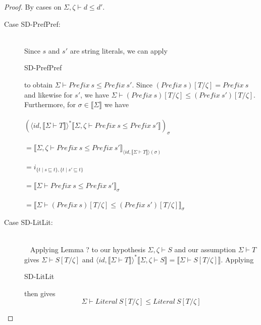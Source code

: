 \documentclass{article}
\newcommand{\sem}[1]{\llbracket #1 \rrbracket}
\begin{document}
\begin{proof}
By cases on $\Sigma,\zeta \vdash d \leq d'$.
\begin{description}
\item[Case SD-PrefPref:]~\\
Since $s$ and $s'$ are string literals, we can apply \begin{sc}SD-PrefPref\end{sc} to obtain $\Sigma \vdash \mathit{Prefix}~s \leq \mathit{Prefix}~s'$. Since $(\mathit{Prefix}~s)[T/\zeta] = \mathit{Prefix}~s$ and likewise for $s'$, we have $\Sigma \vdash (\mathit{Prefix}~s)[T/\zeta] \leq (\mathit{Prefix}~s')[T/\zeta]$. Furthermore, for $\sigma \in \sem{\Sigma}$ we have\\~\\ 
$(\langle \mathit{id}, \sem{\Sigma \vdash T} \rangle^* \sem{\Sigma,\zeta \vdash \mathit{Prefix}~s \leq \mathit{Prefix}~s'})_\sigma$\\~\\
$= \sem{\Sigma,\zeta \vdash \mathit{Prefix}~s \leq \mathit{Prefix}~s'}_{\langle \mathit{id}, \sem{\Sigma \vdash T} \rangle(\sigma)}$\\~\\
$= i_{\{ t \mid s \sqsubseteq t \}, \{ t \mid s' \sqsubseteq t \}}$\\~\\
$= \sem{\Sigma \vdash \mathit{Prefix}~s \leq \mathit{Prefix}~s'}_{\sigma}$\\~\\
$= \sem{\Sigma \vdash (\mathit{Prefix}~s)[T/\zeta] \leq (\mathit{Prefix}~s')[T/\zeta]}_{\sigma}$
\item[Case SD-LitLit:]~\\
~
Applying Lemma ? to our hypothesis $\Sigma,\zeta \vdash S$ and our assumption $\Sigma \vdash T$ gives
$\Sigma \vdash S[T/\zeta]$ and $\langle \mathit{id}, \sem{\Sigma \vdash T} \rangle^* \sem{\Sigma,\zeta \vdash S} = \sem{\Sigma \vdash S[T/\zeta]}$. Applying \begin{sc}SD-LitLit\end{sc} then gives $$\Sigma \vdash \mathit{Literal}~S[T/\zeta] \leq \mathit{Literal}~S[T/\zeta]$$


\end{description}
\end{proof}
\end{document}

